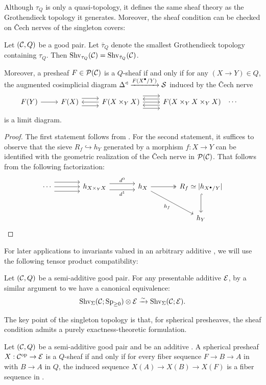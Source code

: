 \documentclass[a4paper,10pt, oneside]{amsart}
\begin{document}
	Although \(\tau_Q\) is only a quasi-topology, it defines the same sheaf theory as the Grothendieck topology it generates. Moreover, the sheaf condition can be checked on Čech nerves of the singleton covers:
	\begin{prop}
		Let $(\mathcal{C},Q)$ be a good pair. Let $\bar{\tau}_Q$ denote the smallest Grothendieck topology containing $\tau_Q$. Then $\operatorname{Shv}_{\tau_Q}(\mathcal{C})=\operatorname{Shv}_{\bar{\tau}_Q}(\mathcal{C})$.
		
		Moreover, a presheaf $F\in\mathcal{P}(\mathcal{C})$ is a $Q$-sheaf if and only if for any $(X\to Y)\in Q$, the augmented cosimplicial diagram $\Delta^\triangleleft\xrightarrow{F(X^\bullet/Y)} \mathcal{S}$ induced by the \v{C}ech nerve
	\[
	\begin{tikzcd}
		F(Y) \arrow[r] & 
		F(X) \arrow[r, shift left=1.2ex] \arrow[r, shift right=1.2ex] & 
		F(X \times_Y X) \arrow[l] \arrow[r, shift left=2ex] \arrow[r] \arrow[r, shift right=2ex] & 
		F(X \times_Y X \times_Y X) \arrow[l, shift left=1ex] \arrow[l, shift right=1ex] \arrow[r, phantom, "\cdots"] & \null
	\end{tikzcd}
	\]
		is a limit diagram.
	\end{prop}
	\begin{proof}
		The first statement follows from \cite[Corollary C.2]{hoyois2015quadratic}. For the second statement, it suffices to observe that the sieve $R_f \hookrightarrow h_Y$ generated by a morphism $f: X \to Y$ can be identified with the geometric realization of the \v{C}ech nerve in $\mathcal{P}(\mathcal{C})$. That follows from the following factorization:
		\[
		\begin{tikzcd}[column sep=large, row sep=large]
			\cdots \arrow[r, shift left=1.5ex] \arrow[r, description] \arrow[r, shift right=1.5ex] & 
			h_{X \times_Y X} \arrow[r, shift left=1ex, "d^0"] \arrow[r, shift right=1ex, "d^1"'] & 
			h_X \arrow[r, two heads] \arrow[rd, "h_f"'] & 
			R_f\simeq|h_{X^\bullet/Y}| \arrow[d, hook] \\
			& & & h_Y
		\end{tikzcd}
		\]
	\end{proof}
	For later applications to invariants valued in an arbitrary additive \infcat, we will use the following tensor product compatibility:
		\begin{rem}
		Let $(\mathcal{C},Q)$ be a semi-additive good pair. For any
		presentable additive \infcat $\mathcal{E}$, by a similar argument to \cite[Proposition 1.3.1.7]{sag} we have a canonical  equivalence:
		$$\operatorname{Shv}_\Sigma(\mathcal{C};\operatorname{Sp}_{\geq0})\otimes\mathcal{E}\xrightarrow[]{\sim} \operatorname{Shv}_\Sigma(\mathcal{C};\mathcal{E}).$$
	\end{rem}
The key point of the singleton topology is that, for spherical presheaves, the sheaf condition admits a purely exactness-theoretic formulation.
		\begin{thm}\label{sphshvcriterion}
		Let $(\mathcal{C},Q)$ be a semi-additive good pair and \mce be an additive \infcat. A spherical presheaf $X:\mathcal{C}^{\mathrm{op}}\to\mathcal{E}$ is a $Q$-sheaf if and only if for every fiber sequence $F\to B\to A$ in \mcc with $B\to A$ in $Q$, the induced sequence
		$X(A)\to X(B)\to X(F)$
		is a fiber sequence in \mce.
	\end{thm}
	
\end{document}
